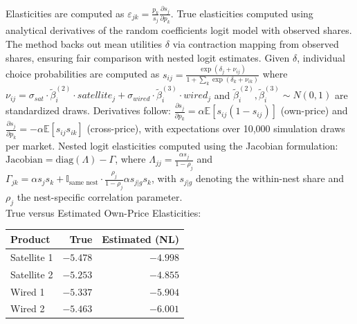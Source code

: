 \documentclass[english,11pt]{article}
\begin{document}
\noindent Elasticities are computed as $\varepsilon_{jk} = \frac{p_k}{s_j} \frac{\partial s_j}{\partial p_k}$. True elasticities computed using analytical derivatives of the random coefficients logit model \citep{berry1995automobile} with observed shares. The method backs out mean utilities $\delta$ via contraction mapping \citep{berry1994estimating} from observed shares, ensuring fair comparison with nested logit estimates. Given $\delta$, individual choice probabilities are computed as $s_{ij} = \frac{\exp(\delta_j + \nu_{ij})}{1 + \sum_k \exp(\delta_k + \nu_{ik})}$ where $\nu_{ij} = \sigma_{sat} \cdot \tilde{\beta}_i^{(2)} \cdot satellite_j + \sigma_{wired} \cdot \tilde{\beta}_i^{(3)} \cdot wired_j$ and $\tilde{\beta}_i^{(2)}, \tilde{\beta}_i^{(3)} \sim N(0,1)$ are standardized draws. Derivatives follow: $\frac{\partial s_j}{\partial p_k} = \alpha \mathbb{E}[s_{ij}(1-s_{ij})]$ (own-price) and $\frac{\partial s_j}{\partial p_k} = -\alpha \mathbb{E}[s_{ij}s_{ik}]$ (cross-price), with expectations over 10,000 simulation draws per market. Nested logit elasticities computed using the Jacobian formulation: $\text{Jacobian} = \text{diag}(\Lambda) - \Gamma$, where $\Lambda_{jj} = \frac{\alpha s_j}{1-\rho_j}$ and $\Gamma_{jk} = \alpha s_j s_k + \mathbb{I}_{\text{same nest}} \cdot \frac{\rho_j}{1-\rho_j} \alpha s_{j|g} s_k$, with $s_{j|g}$ denoting the within-nest share and $\rho_j$ the nest-specific correlation parameter.
\\
\newline
True versus Estimated Own-Price Elasticities:


\begin{center}
\begin{tabular}{lrr}
\hline
Product & True & Estimated (NL) \\
\hline
Satellite 1 & $-5.478$ & $-4.998$ \\
Satellite 2 & $-5.253$ & $-4.855$ \\
Wired 1 & $-5.337$ & $-5.904$ \\
Wired 2 & $-5.463$ & $-6.001$ \\
\hline
\end{tabular}
\end{center}
\end{document}
